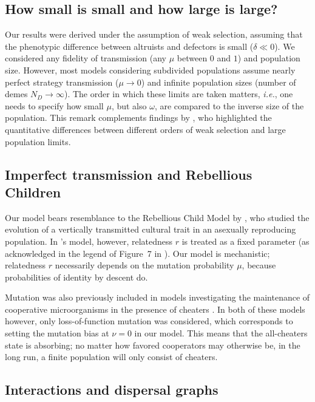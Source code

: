\documentclass[11pt, letterpaper]{article}
\newcommand{\ie}{\textit{i.e.}}
\newcommand{\mutbias}{\nu}
\newcommand{\ndemes}{N_D}
\begin{document}
\subsection*{How small is small and how large is large?}
Our results were derived under the assumption of weak selection, assuming that the phenotypic difference between altruists and defectors is small ($\delta \ll 0$). We considered any fidelity of transmission (any $\mu$ between $0$ and $1$) and population size. However, most models considering subdivided populations assume nearly perfect strategy transmission ($\mu \to 0$) and infinite population sizes (number of demes $\ndemes \to \infty$). The order in which these limits are taken matters, \ie, one needs to specify how small $\mu$, but also $\omega$, are compared to the inverse size of the population. This remark complements findings by \citet{SampleAllen2017}, who highlighted the quantitative differences between different orders of weak selection and large population limits. 

\subsection*{Imperfect transmission and Rebellious Children}
Our model bears resemblance to the Rebellious Child Model by \citet{Frank1997}, who studied the evolution of a vertically transmitted cultural trait in an asexually reproducing population. In \citeauthor{Frank1997}'s model, however, relatedness $r$ is treated as a fixed parameter (as acknowledged in the legend of Figure~7 in \citet{Frank1997}). 
Our model is mechanistic; relatedness $r$ necessarily depends on the mutation probability $\mu$, because probabilities of identity by descent do. 

Mutation was also previously included in models investigating the maintenance of cooperative microorganisms in the presence of cheaters \citep{Brockhurst2007, Frank2010}. In both of these models however, only loss-of-function mutation was considered, which corresponds to setting the mutation bias at $\mutbias=0$ in our model. This means that the all-cheaters state is absorbing; no matter how favored cooperators may otherwise be, in the long run, a finite population will only consist of cheaters. 

\subsection*{Interactions and dispersal graphs}
\end{document}
